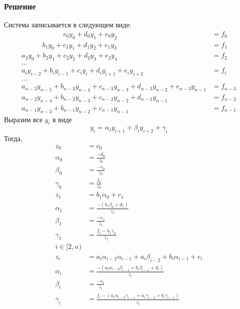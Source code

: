 \documentclass[a4paper, fontsize=14pt]{article}
\begin{document}
\subsubsection*{Решение}
Система записывается в следующем виде:
\begin{equation*}
    \begin{aligned}
        \qquad \qquad \qquad c_0y_0+d_0y_1+e_0y_2&=f_0 \\
        \qquad \quad b_1y_0+c_1y_1+d_1y_2+e_1y_3&=f_1 \\
        a_2y_{0}+b_2y_{1}+c_2y_{2}+d_2y_{3}+e_2y_{4}&=f_2\\
        \dots \\
        a_iy_{i-2}+b_iy_{i-1}+c_iy_{i}+d_iy_{i+1}+e_iy_{i+2}&=f_i\\
        \dots \\
        a_{n-3}y_{n-5}+b_{n-3}y_{n-4}+c_{n-3}y_{n-3}+d_{n-3}y_{n-2}+e_{n-3}y_{n-1}&=f_{n-3}\\
        a_{n-2}y_{n-4}+b_{n-2}y_{n-3}+c_{n-2}y_{n-2}+d_{n-2}y_{n-1}&=f_{n-2}\\
        a_{n-1}y_{n-3}+b_{n-1}y_{n-2}+c_{n-1}y_{n-1} &=f_{n-1}
    \end{aligned}
\end{equation*}
Выразим все $y_i$ в виде 
\begin{equation*}
    y_i=\alpha_iy_{i+1}+\beta_iy_{i+2}+\gamma_i
\end{equation*}
Тогда, 
\begin{equation*}
    \begin{aligned}
        z_0 &=c_0 \\
        \alpha_0&=\frac{-d_0}{z_0} \\
        \beta_0&=\frac{-e_0}{z_0} \\
        \gamma_0&=\frac{f_0}{z_0} \\
        z_1&=b_1\alpha_0+c_1 \\
        \alpha_1&=\frac{-(b_1\beta_0+d_1)}{z_1}\\
        \beta_1&=\frac{-e_1}{z_1}\\
        \gamma_1&=\frac{f_1-b_1\gamma_0}{z_1}\\
        i\in[2,n)\\
        z_i&=a_i\alpha_{i-2}\alpha_{i-1}+a_i\beta_{i-2}+b_i\alpha_{i-1}+c_i\\
        \alpha_i&=\frac{-(a_i\alpha_{i-2}\beta_{i-1}+b_i\beta_{i-1}+d_i)}{z_i}\\
        \beta_i&=\frac{-e_i}{z_i}\\
        \gamma_i&=\frac{f_i-(a_i\alpha_{i-2}\gamma_{i-1}+a_i\gamma_{i-2}+b_i\gamma_{i-1})}{z_i}\\
    \end{aligned}
\end{equation*}
\end{document}

